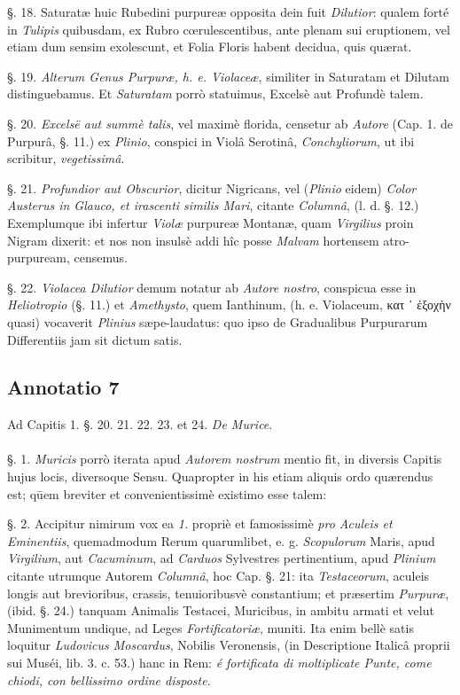 \documentclass[a4paper, 11pt, oneside, polutonikogreek, german]{article}
\begin{document}
§. 18. Saturatæ huic Rubedini purpureæ opposita dein fuit \emph{Dilutior}: qualem forté in \emph{Tulipis} quibusdam, ex Rubro cœrulescentibus, ante plenam sui eruptionem, vel etiam dum sensim exolescunt, et Folia Floris habent decidua, quis quærat.

§. 19. \emph{Alterum Genus Purpuræ, h. e. Violaceæ}, similiter in Saturatam et Dilutam distinguebamus. Et \emph{Saturatam} porrò statuimus, Excelsè aut Profundè talem.

§. 20. \emph{Excelsë aut summè talis}, vel maximè florida, censetur ab \emph{Autore} (Cap. 1. de Purpurâ, §. 11.) ex \emph{Plinio}, conspici in Violâ Serotinâ, \emph{Conchyliorum}, ut ibi scribitur, \emph{vegetissimâ}.

§. 21. \emph{Profundior aut Obscurior}, dicitur Nigricans, vel (\emph{Plinio} eidem) \emph{Color Austerus in Glauco, et irascenti similis Mari}, citante \emph{Columnâ}, (l. d. §. 12.) Exemplumque ibi infertur \emph{Violæ} purpureæ Montanæ, quam \emph{Virgilius} proin Nigram dixerit: et nos non insulsè addi hîc posse \emph{Malvam} hortensem atro-purpuream, censemus.

§. 22. \emph{Violacea Dilutior} demum notatur ab \emph{Autore nostro}, conspicua esse in \emph{Heliotropio} (§. 11.) et \emph{Amethysto}, quem Ianthinum, (h. e. Violaceum, κατ ᾽ ἐξοχὴν quasi) vocaverit \emph{Plinius} sæpe-laudatus: quo ipso de Gradualibus Purpurarum Differentiis jam sit dictum satis.

\subsection{Annotatio 7}
\begin{center}
Ad Capitis 1. §. 20. 21. 22. 23. et 24. \emph{De Murice}.
\end{center}
\paragraph{}
§. 1. \emph{Muricis} porrò iterata apud \emph{Autorem nostrum} mentio fit, in diversis Capitis hujus locis, diversoque Sensu. Quapropter in his etiam aliquis ordo quærendus est; qūem breviter et convenientissimè existimo esse talem:

§. 2. Accipitur nimirum vox ea \emph{1.} propriè et famosissimè \emph{pro Aculeis et Eminentiis}, quemadmodum Rerum quarumlibet, e. g. \emph{Scopulorum} Maris, apud \emph{Virgilium}, aut \emph{Cacuminum}, ad \emph{Carduos} Sylvestres pertinentium, apud \emph{Plinium} citante utrumque Autorem \emph{Columnâ}, hoc Cap. §. 21: ita \emph{Testaceorum}, aculeis longis aut brevioribus, crassis, tenuioribusvè constantium; et præsertim \emph{Purpuræ}, (ibid. §. 24.) tanquam Animalis Testacei, Muricibus, in ambitu armati et velut Munimentum undique, ad Leges \emph{Fortificatoriæ}, muniti. Ita enim bellè satis loquitur \emph{Ludovicus Moscardus}, Nobilis Veronensis, (in Descriptione Italicâ proprii sui Muséi, lib. 3. c. 53.) hanc in Rem: \emph{é fortificata di moltiplicate Punte, come chiodi, con bellissimo ordine disposte}.
\end{document}
